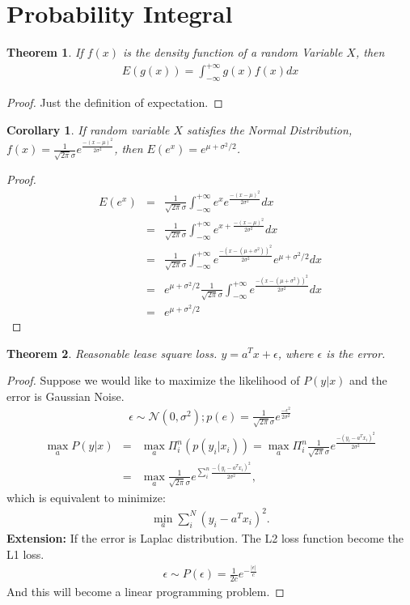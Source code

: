 \documentclass[12pt]{article}
\newtheorem{theorem}{Theorem}[section]
\newtheorem{corollary}{Corollary}[theorem]
\begin{document}
\section{Probability Integral}
\begin{theorem}
	If $f(x)$ is the density function of a random Variable $X$, then 
	\begin{eqnarray}
		E(g(x)) = \int_{-\infty}^{+\infty}g(x)f(x) dx
	\end{eqnarray}
\end{theorem}
\begin{proof}
	Just the definition of expectation. 
\end{proof}
\begin{corollary}
	If random variable $X$ satisfies the Normal Distribution, $f(x) = \frac{1}{\sqrt{2\pi}\sigma}e^{\frac{-(x-\mu)^2}{2\sigma^2}}$, then $E(e^x)=e^{\mu+\sigma^2/2}$.
\end{corollary}
\begin{proof}
\begin{eqnarray}
	E(e^x)&=&\frac{1}{\sqrt{2\pi}\sigma}\int_{-\infty}^{+\infty}e^xe^{\frac{-(x-\mu)^2}{2\sigma^2}}dx\\
	&=&\frac{1}{\sqrt{2\pi}\sigma}\int_{-\infty}^{+\infty}e^{x+\frac{-(x-\mu)^2}{2\sigma^2}}dx\\
	&=&\frac{1}{\sqrt{2\pi}\sigma}\int_{-\infty}^{+\infty}e^{\frac{-\left(x-(\mu+\sigma^2)\right)^2}{2\sigma^2}}e^{\mu+\sigma^2/2}dx\\
	&=&e^{\mu+\sigma^2/2}\frac{1}{\sqrt{2\pi}\sigma}\int_{-\infty}^{+\infty}e^{\frac{-\left(x-(\mu+\sigma^2)\right)^2}{2\sigma^2}}dx\\
	&=&e^{\mu+\sigma^2/2}
\end{eqnarray}
\end{proof}
\begin{theorem}
	Reasonable lease square loss.  $y = a^Tx + \epsilon$, where $\epsilon$ is the error.
\end{theorem}

\begin{proof}
	Suppose we would like to maximize the likelihood of $P(y|x)$ and the error is Gaussian Noise.
	\begin{eqnarray}
		\epsilon \sim \mathcal{N}(0, \sigma^2); p(e) = \frac{1}{\sqrt{2\pi}\sigma}e^{\frac{-\epsilon^2}{2\sigma^2}}
	\end{eqnarray}
	\begin{eqnarray}
		\max_{a} P(y|x)&=& \max_{a} \Pi_i^n (p(y_i|x_i)) = \max_a \Pi_i^n\frac{1}{\sqrt{2\pi}\sigma}e^{\frac{-(y_i - a^T x_i)^2}{2\sigma^2}}\\
		&=& \max_a \frac{1}{\sqrt{2\pi}\sigma}e^{\sum_i^n \frac{-(y_i - a^Tx_i)^2}{2\sigma^2}},
	\end{eqnarray}
	which is equivalent to minimize:
	\begin{eqnarray}
		\min_a \sum_i^N (y_i - a^Tx_i)^2.
	\end{eqnarray}
{\bf Extension: } If the error is Laplac distribution. The L2 loss function become the L1 loss.
\begin{eqnarray}
	\epsilon \sim P(\epsilon) = \frac{1}{2c} e^{-\frac{|\epsilon|}{c}}
\end{eqnarray}
And this will become a linear programming problem.
\end{proof}
\end{document}
